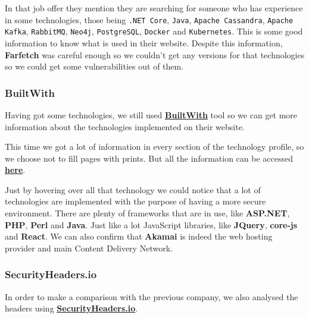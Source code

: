 In that job offer they mention they are searching for someone who has experience in some technologies, those being \texttt{.NET Core}, \texttt{Java}, \texttt{Apache Cassandra}, \texttt{Apache Kafka}, \texttt{RabbitMQ}, \texttt{Neo4j}, \texttt{PostgreSQL}, \texttt{Docker} and \texttt{Kubernetes}. This is some good information to know what is used in their website. Despite this information, \textbf{Farfetch} was careful enough so we couldn't get any versions for that technologies so we could get some vulnerabilities out of them. 


\subsubsection{BuiltWith}

Having got some technologies, we still used \textbf{\href{https://builtwith.com/detailed/farfetch.com/}{BuiltWith}} tool so we can get more information about the technologies implemented on their website. 



This time we got a lot of information in every section of the technology profile, so we choose not to fill pages with prints. But all the information can be accessed \textbf{\href{https://builtwith.com/detailed/farfetch.com/}{here}}.

Just by hovering over all that technology we could notice that a lot of technologies are implemented with the purpose of having a more secure environment. There are plenty of frameworks that are in use, like \textbf{ASP.NET}, \textbf{PHP}, \textbf{Perl} and \textbf{Java}. Just like a lot JavaScript libraries, like \textbf{JQuery}, \textbf{core-js} and \textbf{React}. We can also confirm that \textbf{Akamai} is indeed the web hosting provider and main Content Delivery Network.


\subsubsection{SecurityHeaders.io}

In order to make a comparison with the previous company, we also analysed the headers using \textbf{\href{https://securityheaders.com/?q=farfetch.com&followRedirects=on}{SecurityHeaders.io}}.

